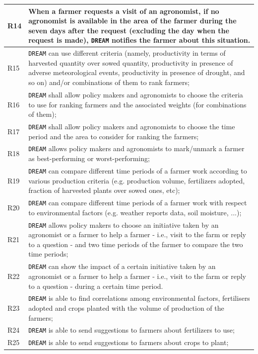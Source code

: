 \documentclass{article}
\begin{document}
\begin{longtable}[c]{|m{0.75cm}|m{11cm}|}
  \hline
  R14\label{R} & When a farmer requests a visit of an agronomist, if no agronomist is available in the area of the farmer during the seven days after the request (excluding the day when the request is made), \verb|DREAM| notifies the farmer about this situation.\\
  \hline
R15\label{R} & \verb|DREAM| can use different criteria (namely, productivity in terms of harvested quantity over sowed quantity, productivity in presence of adverse meteorological events, productivity in presence of drought, and so on) and/or combinations of them to rank farmers;\\
  \hline
R16\label{R} & \verb|DREAM| shall allow policy makers and agronomists to choose the criteria to use for ranking farmers and the associated weights (for combinations of them);\\
  \hline
R17\label{R} & \verb|DREAM| shall allow policy makers and agronomists to choose the time period and the area to consider for ranking the farmers;\\
  \hline
  R18\label{R} & \verb|DREAM| allows policy makers and agronomists to mark/unmark a farmer as best-performing
or worst-performing;\\
  \hline
R19\label{R} & \verb|DREAM| can compare different time periods of a farmer work according to various production criteria (e.g. production volume, fertilizers adopted, fraction of harvested plants over sowed ones, etc);\\
  \hline
R20\label{R} & \verb|DREAM| can compare different time periods of a  farmer work with respect to environmental factors (e.g. weather reports data, soil moisture, ...);\\
  \hline
R21\label{R} & \verb|DREAM| allows policy makers to choose an initiative taken by an agronomist or a farmer to help a farmer - i.e., visit to the farm or reply to a question - and two time periods of the farmer to compare the two time periods;\\
  \hline
R22\label{R} & \verb|DREAM| can show the impact of a certain initiative taken by an agronomist or a farmer to help a farmer - i.e., visit to the farm or reply to a question - during a certain time period.\\
  \hline
  R23\label{R} & \verb|DREAM| is able to find correlations among environmental factors, fertilisers adopted and crops planted with the volume of production of the farmers;\\
  \hline
  R24\label{R} & \verb|DREAM| is able to send suggestions to farmers about fertilizers to use; \\
  \hline
  R25\label{R} & \verb|DREAM| is able to send suggestions to farmers about crops to plant; \\ 
  \hline
 

\end{longtable}
\end{document}
